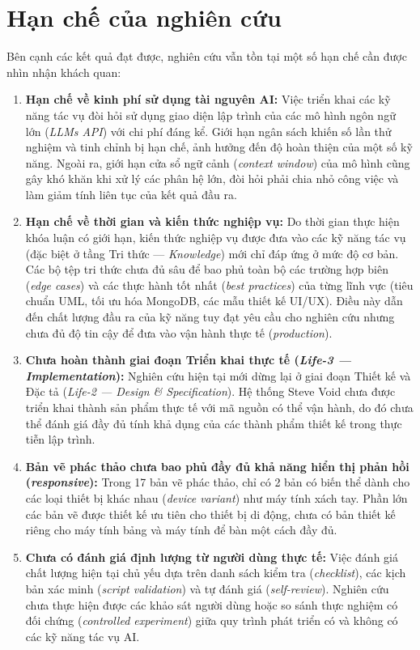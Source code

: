 \documentclass[13pt,a4paper,oneside]{extreport}
\numberwithin{equation}{chapter}
\numberwithin{figure}{chapter}
\numberwithin{table}{chapter}
\begin{document}
\section*{Hạn chế của nghiên cứu}

Bên cạnh các kết quả đạt được, nghiên cứu vẫn tồn tại một số hạn chế cần được nhìn nhận khách quan:

\begin{enumerate}
    \item \textbf{Hạn chế về kinh phí sử dụng tài nguyên AI:} Việc triển khai các kỹ năng tác vụ đòi hỏi sử dụng giao diện lập trình của các mô hình ngôn ngữ lớn (\textit{LLMs API}) với chi phí đáng kể. Giới hạn ngân sách khiến số lần thử nghiệm và tinh chỉnh bị hạn chế, ảnh hưởng đến độ hoàn thiện của một số kỹ năng. Ngoài ra, giới hạn cửa sổ ngữ cảnh (\textit{context window}) của mô hình cũng gây khó khăn khi xử lý các phân hệ lớn, đòi hỏi phải chia nhỏ công việc và làm giảm tính liên tục của kết quả đầu ra.

    \item \textbf{Hạn chế về thời gian và kiến thức nghiệp vụ:} Do thời gian thực hiện khóa luận có giới hạn, kiến thức nghiệp vụ được đưa vào các kỹ năng tác vụ (đặc biệt ở tầng Tri thức — \textit{Knowledge}) mới chỉ đáp ứng ở mức độ cơ bản. Các bộ tệp tri thức chưa đủ sâu để bao phủ toàn bộ các trường hợp biên (\textit{edge cases}) và các thực hành tốt nhất (\textit{best practices}) của từng lĩnh vực (tiêu chuẩn UML, tối ưu hóa MongoDB, các mẫu thiết kế UI/UX). Điều này dẫn đến chất lượng đầu ra của kỹ năng tuy đạt yêu cầu cho nghiên cứu nhưng chưa đủ độ tin cậy để đưa vào vận hành thực tế (\textit{production}).

    \item \textbf{Chưa hoàn thành giai đoạn Triển khai thực tế (\textit{Life-3 — Implementation}):} Nghiên cứu hiện tại mới dừng lại ở giai đoạn Thiết kế và Đặc tả (\textit{Life-2 — Design \& Specification}). Hệ thống Steve Void chưa được triển khai thành sản phẩm thực tế với mã nguồn có thể vận hành, do đó chưa thể đánh giá đầy đủ tính khả dụng của các thành phẩm thiết kế trong thực tiễn lập trình.

    \item \textbf{Bản vẽ phác thảo chưa bao phủ đầy đủ khả năng hiển thị phản hồi (\textit{responsive}):} Trong 17 bản vẽ phác thảo, chỉ có 2 bản có biến thể dành cho các loại thiết bị khác nhau (\textit{device variant}) như máy tính xách tay. Phần lớn các bản vẽ được thiết kế ưu tiên cho thiết bị di động, chưa có bản thiết kế riêng cho máy tính bảng và máy tính để bàn một cách đầy đủ.

    \item \textbf{Chưa có đánh giá định lượng từ người dùng thực tế:} Việc đánh giá chất lượng hiện tại chủ yếu dựa trên danh sách kiểm tra (\textit{checklist}), các kịch bản xác minh (\textit{script validation}) và tự đánh giá (\textit{self-review}). Nghiên cứu chưa thực hiện được các khảo sát người dùng hoặc so sánh thực nghiệm có đối chứng (\textit{controlled experiment}) giữa quy trình phát triển có và không có các kỹ năng tác vụ AI.
\end{enumerate}
\end{document}
